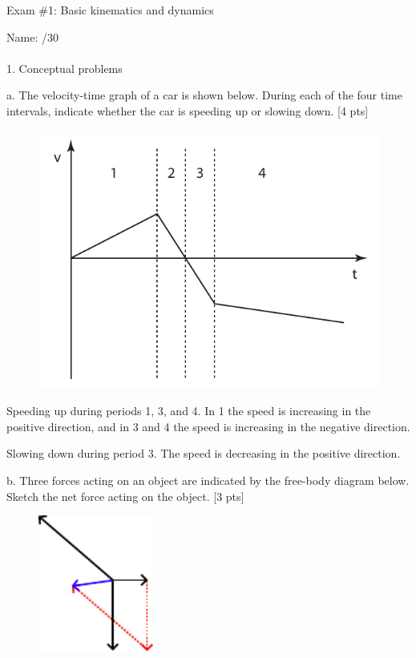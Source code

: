 \documentclass[11pt,letterpaper]{article}
\newcommand{\sol}[1]{{\color{NavyBlue} #1}}
\begin{document}
\setlength{\parindent}{0cm}
\setlength{\parskip}{11pt}
Exam \#1: Basic kinematics and dynamics

Name: \hfill /30\\

\hrulefill\\
1. Conceptual problems

a. The velocity-time graph of a car is shown below. During each of the four time intervals, indicate whether the car is speeding up or slowing down. [4 pts]
\begin{figure}[h]
\includegraphics[]{./exam1_1a}
\end{figure}

\sol{Speeding up during periods 1, 3, and 4. In 1 the speed is increasing in the positive direction, and in 3 and 4 the speed is increasing in the negative direction. 

Slowing down during period 3. The speed is decreasing in the positive direction.} 
\vspace{1cm}

b. Three forces acting on an object are indicated by the free-body diagram below. Sketch the net force acting on the object. [3 pts]
\begin{figure}[h]
\centering
\includegraphics[height=4.5cm]{./exam1_1b_sol}
\end{figure}
\end{document}
